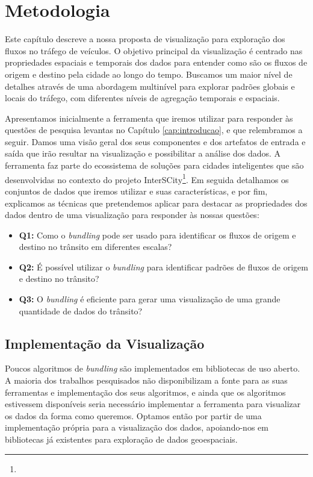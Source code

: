 \chapter{Metodologia}
\label{cap:metodologia}
 Este capítulo descreve a nossa proposta de visualização para exploração dos
fluxos no tráfego de veículos. O objetivo principal da visualização é centrado
nas propriedades espaciais e temporais dos dados para entender como são os
fluxos de origem e destino pela cidade ao longo do tempo. Buscamos um maior
nível de detalhes através de uma abordagem multinível para explorar padrões
globais e locais do tráfego, com diferentes níveis de agregação temporais e
espaciais.

 Apresentamos inicialmente a ferramenta que iremos utilizar para responder às
questões de pesquisa levantas no Capítulo \ref{cap:introducao}, e que
relembramos a seguir. Damos uma visão geral dos seus componentes e dos
artefatos de entrada e saída que irão resultar na visualização e possibilitar a
análise dos dados. A ferramenta faz parte do ecossistema de soluções para
cidades inteligentes que são desenvolvidas no contexto do projeto
InterSCity\footnote{}. Em seguida detalhamos os conjuntos
de dados que iremos utilizar e suas características, e por fim, explicamos as
técnicas que pretendemos aplicar para destacar as propriedades dos dados dentro
de uma visualização para responder às nossas questões:

\begin{itemize}
  \item \textbf{Q1:} Como o \emph{bundling} pode ser usado para identificar os
fluxos de origem e destino no trânsito em diferentes escalas?

  \item \textbf{Q2:} É possível utilizar o \emph{bundling}  para
identificar padrões de fluxos de origem e destino no trânsito?

  \item \textbf{Q3:} O \emph{bundling} é eficiente para gerar uma
visualização de uma grande quantidade de dados do trânsito?
\end{itemize}

\section{Implementação da Visualização}
  Poucos algoritmos de \emph{bundling} são implementados em bibliotecas de uso
aberto. A maioria dos trabalhos pesquisados não disponibilizam a fonte para as
suas ferramentas e implementação dos seus algoritmos, e ainda que os algoritmos
estivessem disponíveis seria necessário implementar a ferramenta para
visualizar os dados da forma como queremos. Optamos então por partir de uma
implementação própria para a visualização dos dados, apoiando-nos em
bibliotecas já existentes para exploração de dados geoespaciais.

